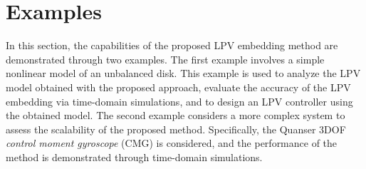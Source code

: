 \section{Examples \label{sec:examples}}
In this section, the capabilities of the proposed LPV embedding method are demonstrated through two examples. The first example involves a simple nonlinear model of an unbalanced disk. This example is used to analyze the LPV model obtained with the proposed approach, evaluate the accuracy of the LPV embedding via time-domain simulations, and to design an LPV controller using the obtained model. The second example considers a more complex system to assess the scalability of the proposed method. Specifically, the Quanser 3DOF \emph{control moment gyroscope} (CMG) is considered, and the performance of the method is demonstrated through time-domain simulations.

